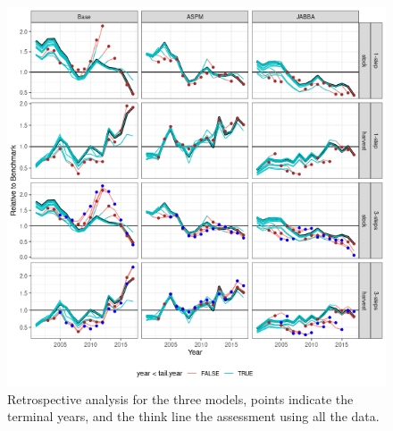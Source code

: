 \documentclass[a4paper]{article}
\begin{document}
\begin{figure}[htbp]
\centering
\includegraphics[width=6in]{final-retro-all-1.png}
\caption{Retrospective analysis for the three models, points indicate the terminal years, and the think line the assessment using all the data.}
\label{fig:retro}
\end{figure}
\end{document}
